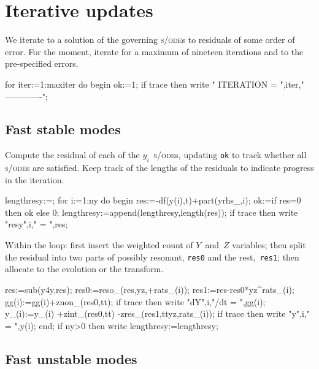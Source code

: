 \documentclass[11pt,a5paper]{article}
\def\sde{\textsc{s/ode}}
\begin{document}
\section{Iterative updates}

We iterate to a solution of the governing \sde{}s to
residuals of some order of error. For the moment, iterate
for a maximum of nineteen iterations and to the
pre-specified errors.
\begin{reduce}
for iter:=1:maxiter do begin
  ok:=1;
  if trace then write "
  ITERATION = ",iter,"
  -------------";
\end{reduce}



\subsection{Fast stable modes}

Compute the residual of each of the $y_i$~\sde{}s, updating
\verb|ok| to track whether all \sde{}s are satisfied.  Keep
track of the lengths of the residuals to indicate progress
in the iteration.
\begin{reduce}
  lengthresy:={};
  for i:=1:ny do begin  
    res:=-df(y(i),t)+part(yrhs_,i);
    ok:=if res=0 then ok else 0;
    lengthresy:=append(lengthresy,{length(res)});
    if trace then write "resy",i," = ",res;
\end{reduce}
Within the loop: first insert the weighted count of
$Y$~and~$Z$ variables; then split the residual into two
parts of possibly resonant, \verb|res0| and the
rest,~\verb|res1|; then allocate to the evolution or the
transform.
\begin{reduce}
    res:=sub(y4y,res);
    res0:=reso_(res,yz,+rats_(i));
    res1:=res-res0*yz^rats_(i);
    gg(i):=gg(i)+znon_(res0,tt);
    if trace then write "dY",i,"/dt = ",gg(i);
    y_(i):=y_(i) +zint_(res0,tt) -zres_(res1,ttyz,rats_(i));
    if trace then write "y",i," = ",y(i);
  end;
  if ny>0 then write lengthresy:=lengthresy;
\end{reduce}



\subsection{Fast unstable modes}
\end{document}
